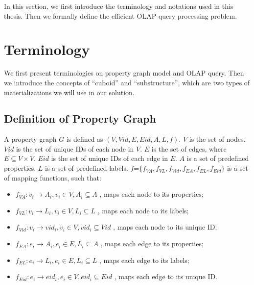 
In this section, we first introduce the terminology and notations used in this thesis. Then we formally define the efficient OLAP query processing problem. 


\section{Terminology}

We first present terminologies on property graph model and OLAP query. Then we introduce the concepts of ``cuboid'' and ``substructure'', which are two types of materializations we will use in our solution. 


\subsection{Definition of Property Graph}
 
A property graph $G$ is defined as $(V, Vid, E, Eid, A, L, f)$. $V$ is the set of nodes. $Vid$ is the set of unique IDs of each node in $V$. $E$ is the set of edges, where $E\subseteq V\times V$. $Eid$ is the set of unique IDs of each edge in $E$. $A$ is a set of predefined properties. $L$ is a set of predefined labels. $f$=$\{f_{VA}, f_{VL}, f_{Vid}, f_{EA}, f_{EL}, f_{Eid}\}$ is a set of mapping functions, such that: 
\begin{itemize}
	\item $f_{VA}: v_{i} \rightarrow A_{i}, v_{i}\in V, A_{i} \subseteq A$ , maps each node to its properties;
	\item $f_{VL}: v_{i} \rightarrow L_{i}, v_{i}\in V, L_{i} \subseteq L$ , maps each node to its labels;
	\item $f_{Vid}: v_{i} \rightarrow vid_{i}, v_{i}\in V, vid_{i} \subseteq Vid$ , maps each node to its unique ID;
	\item $f_{EA}: e_{i} \rightarrow A_{i}, e_{i}\in E, L_{i} \subseteq A$ , maps each edge to its properties;
	\item $f_{EL}: e_{i} \rightarrow L_{i}, e_{i}\in E, L_{i} \subseteq L$ , maps each edge to its labels;
	\item $f_{Eid}: e_{i} \rightarrow eid_{i}, e_{i}\in V, eid_{i} \subseteq Eid$ , maps each edge to its unique ID.
\end{itemize}


